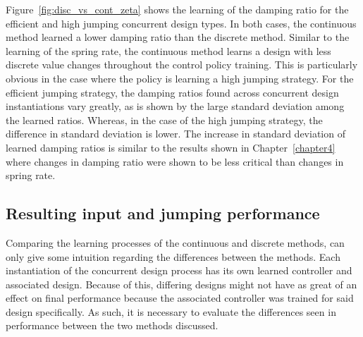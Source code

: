 Figure~\ref{fig:disc_vs_cont_zeta} shows the learning of the damping ratio for the efficient and high jumping concurrent design types. In both cases, the continuous method learned a lower damping ratio than the discrete method. Similar to the learning of the spring rate, the continuous method learns a design with less discrete value changes throughout the control policy training. This is particularly obvious in the case where the policy is learning a high jumping strategy. For the efficient jumping strategy, the damping ratios found across concurrent design instantiations vary greatly, as is shown by the large standard deviation among the learned ratios. Whereas, in the case of the high jumping strategy, the difference in standard deviation is lower. The increase in standard deviation of learned damping ratios is similar to the results shown in Chapter~\ref{chapter4} where changes in damping ratio were shown to be less critical than changes in spring rate.

\subsection{Resulting input and jumping performance}

Comparing the learning processes of the continuous and discrete methods, can only give some intuition regarding the differences between the methods. Each instantiation of the concurrent design process has its own learned controller and associated design. Because of this, differing designs might not have as great of an effect on final performance because the associated controller was trained for said design specifically. As such, it is necessary to evaluate the differences seen in performance between the two methods discussed. 

